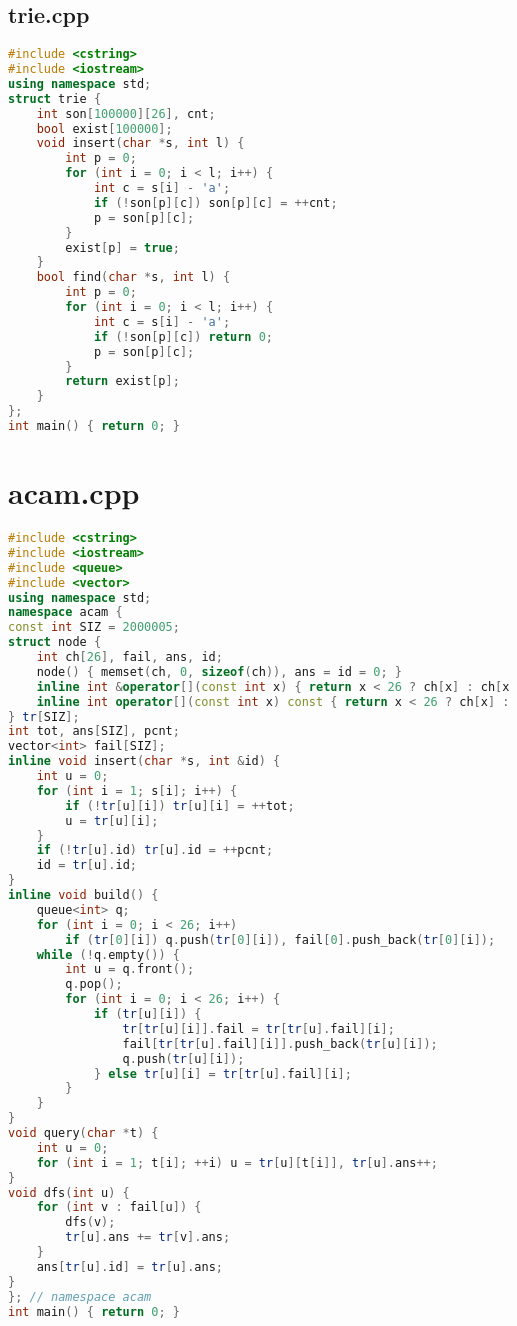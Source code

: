 \documentclass[9pt, a4paper, oneside]{book}
\begin{document}
\subsection{trie.cpp}
\begin{lstlisting}[language={C++}]
#include <cstring>
#include <iostream>
using namespace std;
struct trie {
    int son[100000][26], cnt;
    bool exist[100000];
    void insert(char *s, int l) {
        int p = 0;
        for (int i = 0; i < l; i++) {
            int c = s[i] - 'a';
            if (!son[p][c]) son[p][c] = ++cnt;
            p = son[p][c];
        }
        exist[p] = true;
    }
    bool find(char *s, int l) {
        int p = 0;
        for (int i = 0; i < l; i++) {
            int c = s[i] - 'a';
            if (!son[p][c]) return 0;
            p = son[p][c];
        }
        return exist[p];
    }
};
int main() { return 0; }\end{lstlisting}
\section{acam.cpp}
\begin{lstlisting}[language={C++}]
#include <cstring>
#include <iostream>
#include <queue>
#include <vector>
using namespace std;
namespace acam {
const int SIZ = 2000005;
struct node {
    int ch[26], fail, ans, id;
    node() { memset(ch, 0, sizeof(ch)), ans = id = 0; }
    inline int &operator[](const int x) { return x < 26 ? ch[x] : ch[x - 'a']; }
    inline int operator[](const int x) const { return x < 26 ? ch[x] : ch[x - 'a']; }
} tr[SIZ];
int tot, ans[SIZ], pcnt;
vector<int> fail[SIZ];
inline void insert(char *s, int &id) {
    int u = 0;
    for (int i = 1; s[i]; i++) {
        if (!tr[u][i]) tr[u][i] = ++tot;
        u = tr[u][i];
    }
    if (!tr[u].id) tr[u].id = ++pcnt;
    id = tr[u].id;
}
inline void build() {
    queue<int> q;
    for (int i = 0; i < 26; i++)
        if (tr[0][i]) q.push(tr[0][i]), fail[0].push_back(tr[0][i]);
    while (!q.empty()) {
        int u = q.front();
        q.pop();
        for (int i = 0; i < 26; i++) {
            if (tr[u][i]) {
                tr[tr[u][i]].fail = tr[tr[u].fail][i];
                fail[tr[tr[u].fail][i]].push_back(tr[u][i]);
                q.push(tr[u][i]);
            } else tr[u][i] = tr[tr[u].fail][i];
        }
    }
}
void query(char *t) {
    int u = 0;
    for (int i = 1; t[i]; ++i) u = tr[u][t[i]], tr[u].ans++;
}
void dfs(int u) {
    for (int v : fail[u]) {
        dfs(v);
        tr[u].ans += tr[v].ans;
    }
    ans[tr[u].id] = tr[u].ans;
}
}; // namespace acam
int main() { return 0; }\end{lstlisting}
\end{document}

